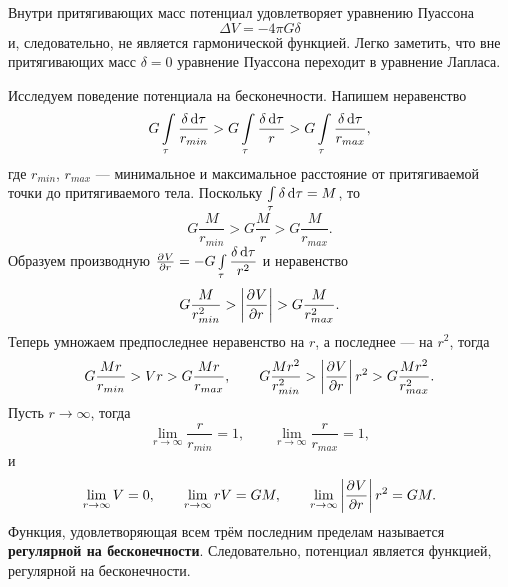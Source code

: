 \documentclass[11pt, a4paper]{article}
\theoremstyle{plain}
\theoremstyle{definition}
\theoremstyle{remark}
\begin{document}
Внутри притягивающих масс потенциал удовлетворяет уравнению Пуассона
\begin{equation*}
    \Delta V = -4\pi G\delta
\end{equation*}
и, следовательно, не является гармонической функцией. Легко заметить, что вне притягивающих масс
$\delta = 0$ уравнение Пуассона переходит в уравнение Лапласа.

Исследуем поведение потенциала на бесконечности. Напишем неравенство
\begin{equation*}
    G\int\limits_\tau\dfrac{\delta\dif\tau}{r_{min}} >
    G\int\limits_\tau\dfrac{\delta\dif\tau}{r} >
    G\int\limits_\tau\dfrac{\delta\dif\tau}{r_{max}},
\end{equation*}
где $r_{min}$, $r_{max}$ --- минимальное и максимальное расстояние от притягиваемой точки до
притягиваемого тела. Поскольку $\int\limits_\tau\delta\dif\tau = M$, то
\begin{equation*}
    G\dfrac{M}{r_{min}} >
    G\dfrac{M}{r} >
    G\dfrac{M}{r_{max}}.
\end{equation*}
Образуем производную $\pd{V}{r} = -G\int\limits_\tau\dfrac{\delta\dif\tau}{r^2}$ и неравенство
\begin{equation*}
    G\dfrac{M}{r^2_{min}} >
     \left|\dpd{V}{r}\right| >
    G\dfrac{M}{r^2_{max}}.
\end{equation*}
Теперь умножаем предпоследнее неравенство на $r$, а последнее --- на $r^2$, тогда
\begin{equation*}
    G\dfrac{Mr}{r_{min}} >
    Vr >
    G\dfrac{Mr}{r_{max}}, \qquad
    G\dfrac{Mr^2}{r^2_{min}} >
     \left|\dpd{V}{r}\right| r^2 >
    G\dfrac{M r^2}{r^2_{max}}.
\end{equation*}
Пусть $r\to\infty$, тогда
\begin{equation*}
    \lim\limits_{r\to\infty}\dfrac{r}{r_{min}} = 1,\qquad 
    \lim\limits_{r\to\infty}\dfrac{r}{r_{max}} = 1,
\end{equation*}
и
\begin{equation*}
    \lim\limits_{r\to\infty} V = 0,\qquad 
    \lim\limits_{r\to\infty} rV = GM,\qquad
    \lim\limits_{r\to\infty} \left|\dpd{V}{r}\right| r^2 = GM.
\end{equation*}
Функция, удовлетворяющая всем трём последним пределам называется \textbf{регулярной на
бесконечности}. Следовательно, потенциал является функцией, регулярной на бесконечности.
\end{document}
